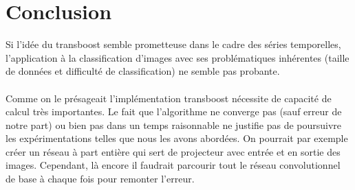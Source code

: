 \documentclass[11 pt]{article}
\begin{document}
\section{Conclusion}
Si l'idée du transboost semble prometteuse dans le cadre des séries temporelles, l'application à la classification d'images avec ses problématiques inhérentes (taille de données et difficulté de classification) ne semble pas probante.

\paragraph{} Comme on le présageait l'implémentation transboost nécessite de capacité de calcul très importantes. Le fait que l'algorithme ne converge pas (sauf erreur de notre part) ou bien pas dans un temps raisonnable ne justifie pas de poursuivre les expérimentations telles que nous les avons abordées. On pourrait par exemple créer un réseau à part entière qui sert de projecteur avec entrée et en sortie des images. Cependant, là encore il faudrait parcourir tout le réseau convolutionnel de base à chaque fois pour remonter l'erreur. 

\bigskip
\nocite{*}


\end{document}
